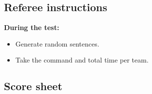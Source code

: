 \subsection{Referee instructions}
\textbf{During the test:}
\begin{itemize}
	\item Generate random sentences. %
	\item Take the command and total time per team.
\end{itemize}


\newpage
\subsection{Score sheet}


 
